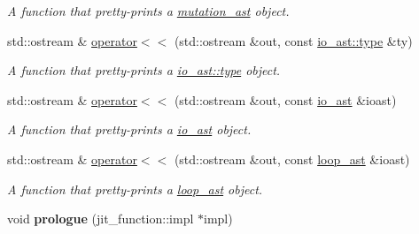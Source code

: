 \begin{DoxyCompactItemize}
\begin{DoxyCompactList}\small\item\em A function that pretty-\/prints a \hyperlink{classbfjit_1_1mutation__ast}{mutation\+\_\+ast} object. \end{DoxyCompactList}\item 
\hypertarget{namespacebfjit_a51292e2e92a0bbf2bc1930d5437693e0}{}\label{namespacebfjit_a51292e2e92a0bbf2bc1930d5437693e0} 
std\+::ostream \& \hyperlink{namespacebfjit_a51292e2e92a0bbf2bc1930d5437693e0}{operator$<$$<$} (std\+::ostream \&out, const \hyperlink{classbfjit_1_1io__ast_ae0b93ddde6f86aed45dd22b72d290414}{io\+\_\+ast\+::type} \&ty)
\begin{DoxyCompactList}\small\item\em A function that pretty-\/prints a \hyperlink{classbfjit_1_1io__ast_ae0b93ddde6f86aed45dd22b72d290414}{io\+\_\+ast\+::type} object. \end{DoxyCompactList}\item 
\hypertarget{namespacebfjit_af52c593484b4d6f0fe4febf43811b027}{}\label{namespacebfjit_af52c593484b4d6f0fe4febf43811b027} 
std\+::ostream \& \hyperlink{namespacebfjit_af52c593484b4d6f0fe4febf43811b027}{operator$<$$<$} (std\+::ostream \&out, const \hyperlink{classbfjit_1_1io__ast}{io\+\_\+ast} \&ioast)
\begin{DoxyCompactList}\small\item\em A function that pretty-\/prints a \hyperlink{classbfjit_1_1io__ast}{io\+\_\+ast} object. \end{DoxyCompactList}\item 
\hypertarget{namespacebfjit_a845e544a129fbae6cd93460021922bea}{}\label{namespacebfjit_a845e544a129fbae6cd93460021922bea} 
std\+::ostream \& \hyperlink{namespacebfjit_a845e544a129fbae6cd93460021922bea}{operator$<$$<$} (std\+::ostream \&out, const \hyperlink{classbfjit_1_1loop__ast}{loop\+\_\+ast} \&ioast)
\begin{DoxyCompactList}\small\item\em A function that pretty-\/prints a \hyperlink{classbfjit_1_1loop__ast}{loop\+\_\+ast} object. \end{DoxyCompactList}\item 
\hypertarget{namespacebfjit_ae0af2cb10b3785b75f51e846b46fbc00}{}\label{namespacebfjit_ae0af2cb10b3785b75f51e846b46fbc00} 
void {\bfseries prologue} (jit\+\_\+function\+::impl $\ast$impl)
\item 
\hypertarget{namespacebfjit_aa8e79a40d19e72d22ade985a63055392}{}\label{namespacebfjit_aa8e79a40d19e72d22ade985a63055392} 

\end{DoxyCompactItemize}
